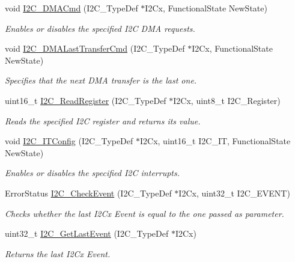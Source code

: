 \begin{DoxyCompactItemize}
void \hyperlink{group___i2_c_ga38502ce11e5ec923e0f6476aaa35b45c}{I2\-C\-\_\-\-D\-M\-A\-Cmd} (I2\-C\-\_\-\-Type\-Def $\ast$I2\-Cx, Functional\-State New\-State)
\begin{DoxyCompactList}\small\item\em Enables or disables the specified I2\-C D\-M\-A requests. \end{DoxyCompactList}\item 
void \hyperlink{group___i2_c_gab2e994c5681eb6ec7c26a03ffe1de060}{I2\-C\-\_\-\-D\-M\-A\-Last\-Transfer\-Cmd} (I2\-C\-\_\-\-Type\-Def $\ast$I2\-Cx, Functional\-State New\-State)
\begin{DoxyCompactList}\small\item\em Specifies that the next D\-M\-A transfer is the last one. \end{DoxyCompactList}\item 
uint16\-\_\-t \hyperlink{group___i2_c_ga8021dc796d15f997356b0583d6346805}{I2\-C\-\_\-\-Read\-Register} (I2\-C\-\_\-\-Type\-Def $\ast$I2\-Cx, uint8\-\_\-t I2\-C\-\_\-\-Register)
\begin{DoxyCompactList}\small\item\em Reads the specified I2\-C register and returns its value. \end{DoxyCompactList}\item 
void \hyperlink{group___i2_c_ga58fed146a06cb81d2940604e460de047}{I2\-C\-\_\-\-I\-T\-Config} (I2\-C\-\_\-\-Type\-Def $\ast$I2\-Cx, uint16\-\_\-t I2\-C\-\_\-\-I\-T, Functional\-State New\-State)
\begin{DoxyCompactList}\small\item\em Enables or disables the specified I2\-C interrupts. \end{DoxyCompactList}\item 
Error\-Status \hyperlink{group___i2_c_ga2d5701342f9d4c1f09bf9d3cdcacc326}{I2\-C\-\_\-\-Check\-Event} (I2\-C\-\_\-\-Type\-Def $\ast$I2\-Cx, uint32\-\_\-t I2\-C\-\_\-\-E\-V\-E\-N\-T)
\begin{DoxyCompactList}\small\item\em Checks whether the last I2\-Cx Event is equal to the one passed as parameter. \end{DoxyCompactList}\item 
uint32\-\_\-t \hyperlink{group___i2_c_ga29237aea9b5a3ead33167e1d027e9f1a}{I2\-C\-\_\-\-Get\-Last\-Event} (I2\-C\-\_\-\-Type\-Def $\ast$I2\-Cx)
\begin{DoxyCompactList}\small\item\em Returns the last I2\-Cx Event. \end{DoxyCompactList}\item 

\end{DoxyCompactItemize}
